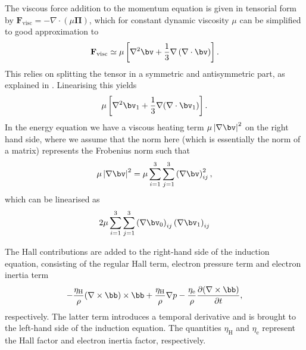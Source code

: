 The viscous force addition to the momentum equation is given in tensorial form by
$\mathbf{F}_{\mathrm{visc}} = -\nabla\cdot\left(\mu\mathbf{\Pi}\right)$, which for constant dynamic viscosity $\mu$ can be simplified to good approximation to
\begin{equation}
	\mathbf{F}_{\mathrm{visc}} \simeq \mu \left[ \nabla^2\bv + \frac{1}{3} \nabla\left(\nabla\cdot\bv\right)\right].
\end{equation}
This relies on splitting the tensor in a symmetric and antisymmetric part, as explained in \citet{porth2014_amrvac}. Linearising this yields
\begin{equation}
  \mu\left[\nabla^2\bv_1 + \frac{1}{3}\nabla(\nabla \cdot \bv_1)\right].
\end{equation}
In the energy equation we have a viscous heating term $\mu \left|\nabla \bv\right|^2$ on the right hand side, where we assume that the norm here (which is essentially the norm of a matrix) represents the Frobenius norm such that
\begin{equation}
  \mu\left|\nabla \bv\right|^2 = \mu\sum_{i=1}^{3}\sum_{j=1}^{3}\left(\nabla \bv\right)_{ij}^2,
\end{equation}
which can be linearised as
\begin{equation}
  2\mu\sum_{i=1}^{3}\sum_{j=1}^{3}\left(\nabla \bv_0\right)_{ij}\left(\nabla \bv_1\right)_{ij}
\end{equation}

The Hall contributions are added to the right-hand side of the induction equation, consisting of the regular Hall term, electron pressure term and electron inertia term
\begin{equation}
  -\frac{\eta_\text{H}}{\rho}(\nabla \times \bb) \times \bb
  + \frac{\eta_\text{H}}{\rho}\nabla p
  - \frac{\eta_\text{e}}{\rho}\frac{\partial (\nabla \times \bb)}{\partial t},
\end{equation}
respectively. The latter term introduces a temporal derivative and is brought to the left-hand side of the induction equation. The quantities $\eta_\text{H}$ and $\eta_\text{e}$ represent the Hall factor and electron inertia factor, respectively.




